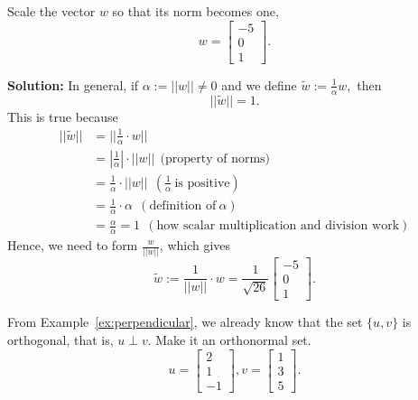 
\begin{example}
\label{ex:NormalizeLengthOne} 
Scale the vector $w$ so that its norm becomes one,
$$
w= \left[ \begin{array}{r} -5 \\ 0 \\ 1\end{array} \right].$$
\end{example}
 \vspace*{.5cm}
 
\textbf{Solution:} In general, if  $\alpha:= ||w|| \neq 0$ and we define $\tilde{w}:= \frac{1}{\alpha} w, $ then $$|| \tilde{w}||=1.$$
This is true because 
\begin{align*}
    || \tilde{w}||&= || \frac{1}{\alpha} \cdot {w}||\\
    &= \left|\frac{1}{\alpha}\right|\cdot || {w}|| ~~\text{(property of norms)}\\
    &= \frac{1}{\alpha} \cdot || {w}|| ~~(\frac{1}{\alpha}~\text{is positive})\\ 
    &= \frac{1}{\alpha} \cdot \alpha ~~(\text{definition of}~\alpha)\\
    &= \frac{\alpha}{\alpha} =1~~(\text{how scalar multiplication and division work})
\end{align*}
Hence, we need to form $\frac{w}{||w||}$, which gives
$$\tilde{w}:= \frac{1}{||w||} \cdot w = \frac{1}{\sqrt{26}}\left[ \begin{array}{r} -5 \\ 0 \\ 1\end{array} \right].$$ \Qed

\begin{example}
\label{ex:Orthonormal}
From Example~\ref{ex:perpendicular}, we already know that the set $\{u, v\}$ is orthogonal, that is, $u \perp v$. Make it an orthonormal set.
$$
u =  \left[ \begin{array}{r} 2 \\ 1 \\ -1\end{array} \right] , v= \left[ \begin{array}{r} 1\\ 3\\ 5 \end{array} \right].$$
\end{example}
 \vspace*{.5cm}
 
